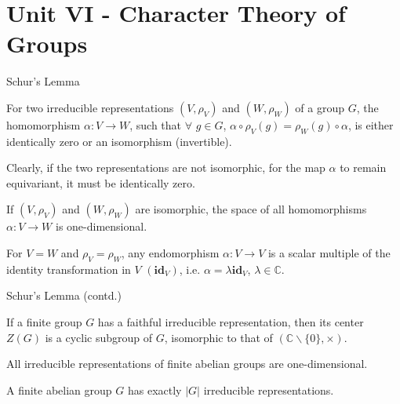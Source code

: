 \documentclass{beamer}
\begin{document}
\section{Unit VI - Character Theory of Groups}

\begin{frame}{Schur's Lemma}
    \begin{lemma}
        For two irreducible representations $(V,\rho_V)$ and $(W,\rho_W)$ of a group $G$, the homomorphism $\alpha:V\xrightarrow{}W$, such that $\forall$ $g\in G$, $\alpha\circ\rho_V(g)=\rho_W(g)\circ\alpha$, is either identically zero or an isomorphism (invertible).
    \end{lemma}
    Clearly, if the two representations are not isomorphic, for the map $\alpha$ to remain equivariant, it must be identically zero.
    \begin{corollary}
        If $(V,\rho_V)$ and $(W,\rho_W)$ are isomorphic, the space of all homomorphisms $\alpha:V\xrightarrow{}W$ is one-dimensional.
    \end{corollary}
    \begin{corollary}
        For $V=W$ and $\rho_V=\rho_W$, any endomorphism $\alpha:V\xrightarrow{}V$ is a scalar multiple of the identity transformation in $V$ $(\mathbf{id}_V)$, i.e. $\alpha=\lambda\mathbf{id}_V$, $\lambda\in\mathbb{C}$.
    \end{corollary}
\end{frame}

\begin{frame}{Schur's Lemma (contd.)}
    \begin{corollary}
        If a finite group $G$ has a faithful irreducible representation, then its center $Z(G)$ is a cyclic subgroup of $G$, isomorphic to that of $(\mathbb{C}\backslash \{0\},\times)$.
    \end{corollary}
    \begin{corollary}
        All irreducible representations of finite abelian groups are one-dimensional.
    \end{corollary}
    \begin{corollary}
        A finite abelian group $G$ has exactly $\lvert G\rvert$ irreducible representations.
    \end{corollary}
\end{frame}
\end{document}
